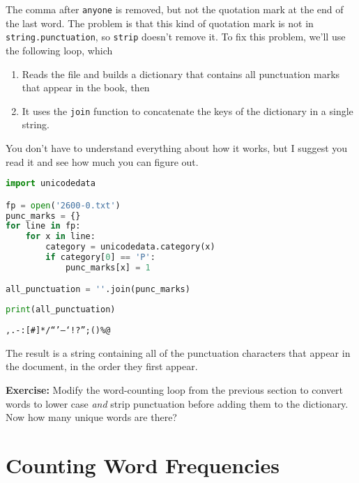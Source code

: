 The comma after \passthrough{\lstinline!anyone!} is removed, but not the
quotation mark at the end of the last word.
The problem is that this kind of quotation mark is not in
\passthrough{\lstinline!string.punctuation!}, so
\passthrough{\lstinline!strip!} doesn't remove it. To fix this problem,
we'll use the following loop, which

\begin{enumerate}
\def\labelenumi{\arabic{enumi}.}
\item
  Reads the file and builds a dictionary that contains all punctuation
  marks that appear in the book, then
\item
  It uses the \passthrough{\lstinline!join!} function to concatenate the
  keys of the dictionary in a single string.
\end{enumerate}

You don't have to understand everything about how it works, but I
suggest you read it and see how much you can figure out.

\begin{lstlisting}[language=Python,style=source]
import unicodedata

fp = open('2600-0.txt')
punc_marks = {}
for line in fp:
    for x in line:
        category = unicodedata.category(x)
        if category[0] == 'P':
            punc_marks[x] = 1

all_punctuation = ''.join(punc_marks)
\end{lstlisting}

\pagebreak

\begin{lstlisting}[language=Python,style=source]
print(all_punctuation)
\end{lstlisting}

\begin{lstlisting}[style=output]
,.-:[#]*/“’—‘!?”;()%@
\end{lstlisting}

The result is a string containing all of the punctuation characters that
appear in the document, in the order they first appear.

\textbf{Exercise:} Modify the word-counting loop from the previous
section to convert words to lower case \emph{and} strip punctuation
before adding them to the dictionary. Now how many unique words are
there?

\section{Counting Word Frequencies}\label{counting-word-frequencies}

